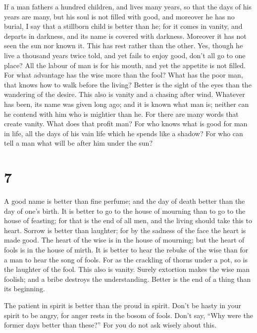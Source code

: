  If a man fathers a hundred children, and lives many years,
so that the days of his years are many, but his soul is not filled with
good, and moreover he has no burial, I say that a stillborn child is
better than he;  for it comes in vanity, and departs in
darkness, and its name is covered with darkness.  Moreover
it has not seen the sun nor known it. This has rest rather than the
other.  Yes, though he live a thousand years twice told, and
yet fails to enjoy good, don't all go to one place?  All the
labour of man is for his mouth, and yet the appetite is not filled.
 For what advantage has the wise more than the fool? What
has the poor man, that knows how to walk before the living? 
Better is the sight of the eyes than the wandering of the desire. This
also is vanity and a chasing after wind.  Whatever has
been, its name was given long ago; and it is known what man is; neither
can he contend with him who is mightier than he.  For there
are many words that create vanity. What does that profit man?
 For who knows what is good for man in life, all the days
of his vain life which he spends like a shadow? For who can tell a man
what will be after him under the sun?

\hypertarget{section-6}{%
\section{7}\label{section-6}}

 A good name is better than fine perfume; and the day of
death better than the day of one's birth.  It is better to
go to the house of mourning than to go to the house of feasting; for
that is the end of all men, and the living should take this to heart.
 Sorrow is better than laughter; for by the sadness of the
face the heart is made good.  The heart of the wise is in
the house of mourning; but the heart of fools is in the house of mirth.
 It is better to hear the rebuke of the wise than for a man
to hear the song of fools.  For as the crackling of thorns
under a pot, so is the laughter of the fool. This also is vanity.
 Surely extortion makes the wise man foolish; and a bribe
destroys the understanding.  Better is the end of a thing
than its beginning.

The patient in spirit is better than the proud in spirit. 
Don't be hasty in your spirit to be angry, for anger rests in the bosom
of fools.  Don't say, ``Why were the former days better
than these?'' For you do not ask wisely about this.

